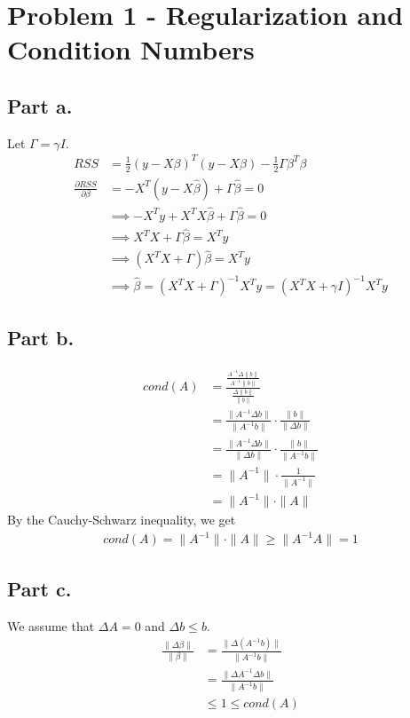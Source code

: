 \documentclass[12pt]{article}
\begin{document}
\maketitle

\section*{Problem 1 - Regularization and Condition Numbers}
\subsection*{Part a.}
Let $\Gamma = \gamma I$.
\begin{align*}
RSS &= \frac{1}{2}(y-X\beta)^T(y-X\beta) - \frac{1}{2}\Gamma\beta^T\beta \\
\frac{\partial{RSS}}{\partial{\beta}} &= -X^T(y-X\hat{\beta}) + \Gamma\hat{\beta} = 0 \\
&\implies -X^Ty + X^TX\hat{\beta} + \Gamma\hat{\beta} = 0\\
&\implies X^TX + \Gamma\hat{\beta} = X^Ty\\
&\implies (X^TX+\Gamma)\hat{\beta} = X^Ty\\
&\implies \hat{\beta} = (X^TX + \Gamma)^{-1} X^Ty  =(X^TX + \gamma I)^{-1} X^Ty
\end{align*}

\subsection*{Part b.}
\begin{align*} 
cond(A) &= \frac{\frac{A^{-1}\Delta\|b\|}{A^{-1}\|b\|}}{\frac{\Delta\|b\|}{\|b\|}} \\
&= \frac{\|A^{-1}\Delta b\|}{\|A^{-1}b\|} \cdot \frac{\|b\|}{\|\Delta b\|} \\
&= \frac{\|A^{-1}\Delta b\|}{\|\Delta b\|} \cdot \frac{\|b\|}{\|A^{-1}b\|} \\
&= \|A^{-1}\| \cdot \frac{1}{\|A^{-1}\|}\\
&= \|A^{-1}\|\cdot\|A\|
\end{align*}
By the Cauchy-Schwarz inequality, we get 
\begin{align*}
cond(A) = \|A^{-1}\|\cdot\|A\| \geq \|A^{-1}A\| = 1
\end{align*}

\subsection*{Part c.}
We assume that $\Delta A = 0$ and $\Delta b \leq b$.
\begin{align*}
\frac{\|\Delta \beta\|}{\|\beta\|} &= \frac{\|\Delta(A^{-1}b)\|}{\|A^{-1}b\|} \\
&= \frac{\|\Delta A^{-1}\Delta b\|}{\|A^{-1}b\|} \\
&\leq 1 \leq cond(A)
\end{align*}
\end{document}
